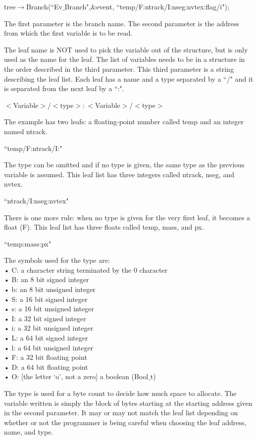 \documentclass[12pt,a4paper]{article}
\begin{document}
tree$\rightarrow$Branch(``Ev$\_$Branch",$\&$event, ``temp/F:ntrack/I:nseg:nvtex:flag/i");

The first parameter is the branch name. The second parameter is the address from which the first variable is to be read. 

The leaf name is NOT used to pick the variable out of the structure, but is only used as the name for the leaf. The list of variables needs to be in a structure in the order described in the third parameter. This third parameter is a string describing the leaf list. Each leaf has a name and a type separated by a ``/" and it is separated from the next leaf by a ``:".

$<$Variable$>/<$type$>:<$Variable$>/<$type$>$

The example has two leafs: a floating-point number called temp and an integer named ntrack. 

``temp/F:ntrack/I:"

The type can be omitted and if no type is given, the same type as the previous variable is assumed. This leaf list has three integers called ntrack, nseg, and nvtex.

``ntrack/I:nseg:nvtex"

There is one more rule: when no type is given for the very first leaf, it becomes a float (F). This leaf list has three
floats called temp, mass, and px.

``temp:mass:px"

The symbols used for the type are: \\
• C: a character string terminated by the 0 character \\
• B: an 8 bit signed integer \\
• b: an 8 bit unsigned integer \\
• S: a 16 bit signed integer \\
• s: a 16 bit unsigned integer \\
• I: a 32 bit signed integer \\
• i: a 32 bit unsigned integer \\
• L: a 64 bit signed integer \\
• l: a 64 bit unsigned integer \\
• F: a 32 bit floating point \\
• D: a 64 bit floating point \\
• O: [the letter `o', not a zero] a boolean (Bool$\_$t)

The type is used for a byte count to decide how much space to allocate. The variable written is simply the block of bytes starting at the starting address given in the second parameter. It may or may not match the leaf list depending on whether or not the programmer is being careful when choosing the leaf address, name, and type.
\end{document}

